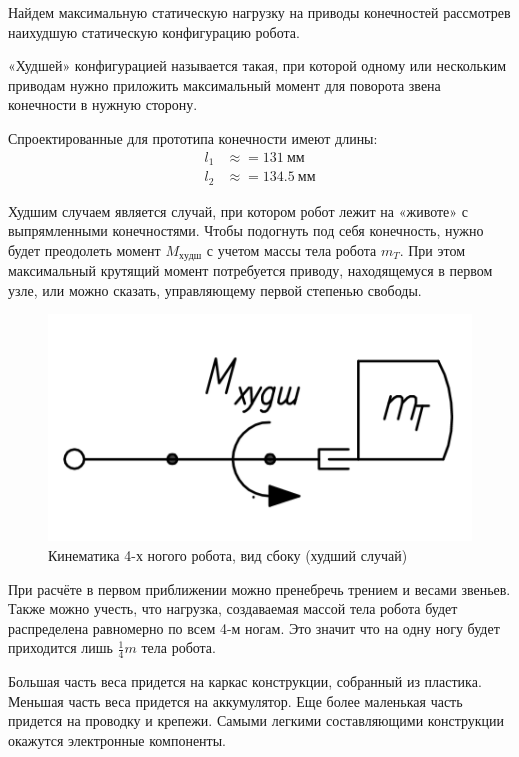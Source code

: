 Найдем максимальную статическую нагрузку на приводы конечностей рассмотрев наихудшую статическую конфигурацию робота.

«Худшей» конфигурацией называется такая, при которой одному или нескольким приводам нужно приложить максимальный момент для поворота звена конечности в нужную сторону.

Спроектированные для прототипа конечности имеют длины:
\begin{align*}
    l_1 &\approx = 131\: мм \\
    l_2 &\approx = 134.5\: мм
\end{align*}

Худшим случаем является случай, при котором робот лежит на «животе» с выпрямленными конечностями. Чтобы подогнуть под себя конечность, нужно будет преодолеть момент $M_{худш}$ с учетом массы тела робота $m_T$. При этом максимальный крутящий момент потребуется приводу, находящемуся в первом узле, или можно сказать, управляющему первой степенью свободы.

\begin{figure}[ht]
    \centering
    \includegraphics[scale=1]{kin2.png}
    \caption{Кинематика 4-х ногого робота, вид сбоку (худший случай)}
\end{figure}

При расчёте в первом приближении можно пренебречь трением и весами звеньев. Также можно учесть, что нагрузка, создаваемая массой тела робота будет распределена равномерно по всем 4-м ногам. Это значит что на одну ногу будет приходится лишь $\frac{1}{4}m$ тела робота.

Большая часть веса придется на каркас конструкции, собранный из пластика. Меньшая часть веса придется на аккумулятор. Еще более маленькая часть придется на проводку и крепежи. Самыми легкими составляющими конструкции окажутся электронные компоненты. 

